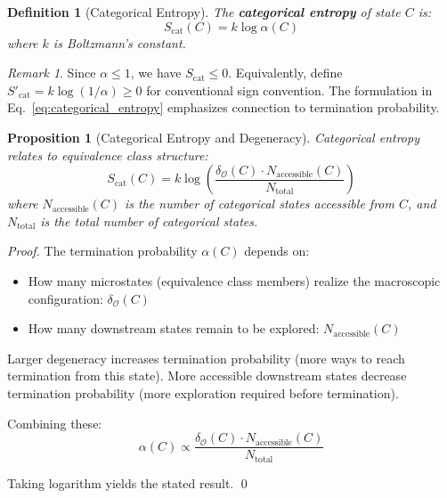 \documentclass[11pt]{article}
\newtheorem{definition}[theorem]{Definition}
\newtheorem{proposition}[theorem]{Proposition}
\theoremstyle{remark}
\newtheorem{remark}[theorem]{Remark}
\begin{document}
\begin{definition}[Categorical Entropy]
\label{def:categorical_entropy}
The \textbf{categorical entropy} of state $C$ is:
\begin{equation}
S_{\text{cat}}(C) = k \log \alpha(C)
\label{eq:categorical_entropy}
\end{equation}
where $k$ is Boltzmann's constant.
\end{definition}

\begin{remark}
Since $\alpha \leq 1$, we have $S_{\text{cat}} \leq 0$. Equivalently, define $S'_{\text{cat}} = k \log(1/\alpha) \geq 0$ for conventional sign convention. The formulation in Eq.~\eqref{eq:categorical_entropy} emphasizes connection to termination probability.
\end{remark}

\begin{proposition}[Categorical Entropy and Degeneracy]
\label{prop:entropy_degeneracy}
Categorical entropy relates to equivalence class structure:
\begin{equation}
S_{\text{cat}}(C) = k \log \left( \frac{\delta_{\mathcal{O}}(C) \cdot N_{\text{accessible}}(C)}{N_{\text{total}}} \right)
\end{equation}
where $N_{\text{accessible}}(C)$ is the number of categorical states accessible from $C$, and $N_{\text{total}}$ is the total number of categorical states.
\end{proposition}

\begin{proof}
The termination probability $\alpha(C)$ depends on:
\begin{itemize}
\item How many microstates (equivalence class members) realize the macroscopic configuration: $\delta_{\mathcal{O}}(C)$
\item How many downstream states remain to be explored: $N_{\text{accessible}}(C)$
\end{itemize}

Larger degeneracy increases termination probability (more ways to reach termination from this state). More accessible downstream states decrease termination probability (more exploration required before termination).

Combining these:
\begin{equation}
\alpha(C) \propto \frac{\delta_{\mathcal{O}}(C) \cdot N_{\text{accessible}}(C)}{N_{\text{total}}}
\end{equation}

Taking logarithm yields the stated result. \qed
\end{proof}
\end{document}
